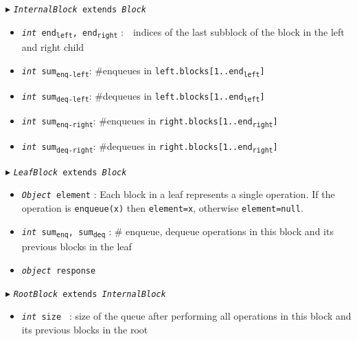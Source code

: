 \documentclass{article}
\newcommand{\sub}[1]{\textsubscript{#1}}
\renewcommand{\tt}[1]{\texttt{#1}}
\renewcommand{\sl}[1]{\textsl{#1}}
\newcommand{\size}{size }
\theoremstyle{definition}
\begin{document}
\begin{algorithm}
\begin{algorithmic}[1]
\Statex $\blacktriangleright$ \tt{\sl{InternalBlock} extends \sl{Block}}
\begin{itemize}
    \item \tt{\sl{int} end\sub{left}, end\sub{right}}
  \textsf{:~~indices of the last subblock of the block in the left and right child}
  \item \tt{\sl{int} sum\sub{enq-left}}\textsf{: \#enqueues in \tt{left.blocks[1..end\sub{left}]}}
  \item \tt{\sl{int} sum\sub{deq-left}}\textsf{: \#dequeues in \tt{left.blocks[1..end\sub{left}]}}
  \item \tt{\sl{int} sum\sub{enq-right}}\textsf{: \#enqueues in \tt{right.blocks[1..end\sub{right}]}}
  \item \tt{\sl{int} sum\sub{deq-right}}\textsf{: \#dequeues in \tt{right.blocks[1..end\sub{right}]}}
\end{itemize}

\Statex $\blacktriangleright$ \tt{\sl{LeafBlock} extends \sl{Block}}
\begin{itemize}
  \item \tt{\sl{Object} element}
  \textsf{: Each block in a leaf represents a single operation. If the operation is \tt{enqueue(x)} then \tt{element=x}, otherwise \tt{element=null}.}
  
    \item \tt{\sl{int} sum\sub{enq}, sum\sub{deq}}
  \textsf{: \# enqueue, dequeue operations in this block and its previous blocks in the leaf}

  \item {\color{red}\tt{\sl{object} response}}
\end{itemize}

\Statex $\blacktriangleright$ \tt{\sl{RootBlock} extends \sl{InternalBlock}}
\begin{itemize}
  \item \tt{\sl{int} \size}
  \textsf{: size of the queue after performing all operations in this block and its previous blocks in the root}
\end{itemize}

\end{algorithmic}
\end{algorithm}
\end{document}
